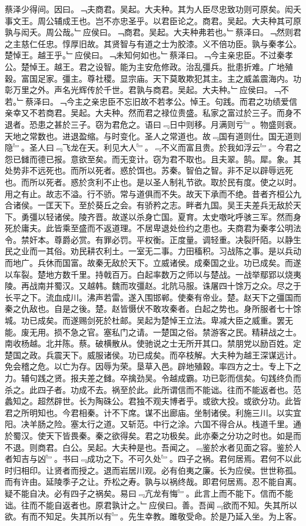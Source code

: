 \documentclass{zhvt-classic}
\begin{document}
\hspace*{2em}蔡泽少得间。因曰。﹁夫商君。吴起。大夫种。其为人臣尽忠致功则可原矣。闳夭事文王。周公辅成王也。岂不亦忠圣乎。以君臣论之。商君。吴起。大夫种其可原孰与闳夭。周公哉。﹂应侯曰。﹁商君。吴起。大夫种弗若也。﹂蔡泽曰。﹁然则君之主慈仁任忠。惇厚旧故。其贤智与有道之士为胶漆。义不倍功臣。孰与秦孝公。楚悼王。越王乎。﹂应侯曰。﹁未知何如也。﹂蔡泽曰。﹁今主亲忠臣。不过秦孝公。楚悼王。越王。君之设智。能为主安危修政。治乱彊兵。批患折难。广地殖穀。富国足家。彊主。尊社稷。显宗庙。天下莫敢欺犯其主。主之威盖震海内。功彰万里之外。声名光辉传於千世。君孰与商君。吴起。大夫种。﹂应侯曰。﹁不若。﹂蔡泽曰。﹁今主之亲忠臣不忘旧故不若孝公。悼王。句践。而君之功绩爱信亲幸又不若商君。吴起。大夫种。然而君之禄位贵盛。私家之富过於三子。而身不退者。恐患之甚於三子。窃为君危之。语曰﹃日中则移。月满则亏﹄。物盛则衰。天地之常数也。进退盈缩。与时变化。圣人之常道也。故﹃国有道则仕。国无道则隐﹄。圣人曰﹃飞龙在天。利见大人﹄。﹃不义而富且贵。於我如浮云﹄。今君之怨已雠而德已报。意欲至矣。而无变计。窃为君不取也。且夫翠。鹄。犀。象。其处势非不远死也。而所以死者。惑於饵也。苏秦。智伯之智。非不足以辟辱远死也。而所以死者。惑於贪利不止也。是以圣人制礼节欲。取於民有度。使之以时。用之有止。故志不溢。行不骄。常与道俱而不失。故天下承而不绝。昔者齐桓公九合诸侯。一匡天下。至於葵丘之会。有骄矜之志。畔者九国。吴王夫差兵无敌於天下。勇彊以轻诸侯。陵齐晋。故遂以杀身亡国。夏育。太史噭叱呼骇三军。然而身死於庸夫。此皆乘至盛而不返道理。不居卑退处俭约之患也。夫商君为秦孝公明法令。禁奸本。尊爵必赏。有罪必罚。平权衡。正度量。调轻重。决裂阡陌。以静生民之业而一其俗。劝民耕农利土。一室无二事。力田稸积。习战陈之事。是以兵动而地广。兵休而国富。故秦无敌於天下。立威诸侯。成秦国之业。功已成矣。而遂以车裂。楚地方数千里。持戟百万。白起率数万之师以与楚战。一战举鄢郢以烧夷陵。再战南并蜀汉。又越韩。魏而攻彊赵。北阬马服。诛屠四十馀万之众。尽之于长平之下。流血成川。沸声若雷。遂入围邯郸。使秦有帝业。楚。赵天下之彊国而秦之仇敌也。自是之後。楚。赵皆慑伏不敢攻秦者。白起之势也。身所服者七十馀城。功已成矣。而遂赐剑死於杜邮。吴起为楚悼王立法。卑减大臣之威重。罢无能。废无用。损不急之官。塞私门之请。一楚国之俗。禁游客之民。精耕战之士。南收杨越。北并陈。蔡。破横散从。使驰说之士无所开其口。禁朋党以励百姓。定楚国之政。兵震天下。威服诸侯。功已成矣。而卒枝解。大夫种为越王深谋远计。免会稽之危。以亡为存。因辱为荣。垦草入邑。辟地殖穀。率四方之士。专上下之力。辅句践之贤。报夫差之雠。卒擒劲吴。令越成霸。功已彰而信矣。句践终负而杀之。此四子者。功成不去。祸至於此。此所谓信而不能诎。往而不能返者也。范蠡知之。超然辟世。长为陶硃公。君独不观夫博者乎。或欲大投。或欲分功。此皆君之所明知也。今君相秦。计不下席。谋不出廊庙。坐制诸侯。利施三川。以实宜阳。决羊肠之险。塞太行之道。又斩范。中行之涂。六国不得合从。栈道千里。通於蜀汉。使天下皆畏秦。秦之欲得矣。君之功极矣。此亦秦之分功之时也。如是而不退。则商君。白公。吴起。大夫种是也。吾闻之。﹃鉴於水者见面之容。鉴於人者知吉与凶﹄。书曰﹃成功之下。不可久处﹄。四子之祸。君何居焉。君何不以此时归相印。让贤者而授之。退而岩居川观。必有伯夷之廉。长为应侯。世世称孤。而有许由。延陵季子之让。乔松之寿。孰与以祸终哉。即君何居焉。忍不能自离。疑不能自决。必有四子之祸矣。易曰﹃亢龙有悔﹄。此言上而不能下。信而不能诎。往而不能自返者也。原君孰计之。﹂应侯曰。善。吾闻﹃欲而不知。失其所以欲。有而不知足。失其所以有﹄。先生幸教。雎敬受命。於是乃延入坐。为上客。\\
\end{document}
